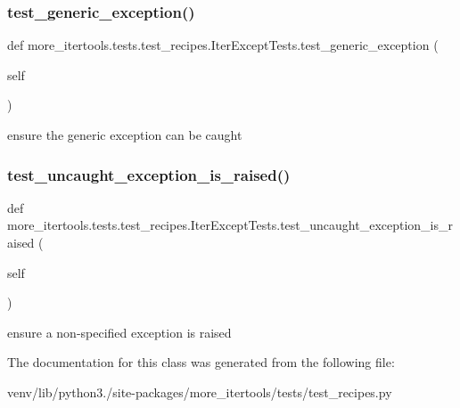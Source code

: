 \subsubsection{\texorpdfstring{test\+\_\+generic\+\_\+exception()}{test\_generic\_exception()}}
{\footnotesize\ttfamily def more\+\_\+itertools.\+tests.\+test\+\_\+recipes.\+Iter\+Except\+Tests.\+test\+\_\+generic\+\_\+exception (\begin{DoxyParamCaption}\item[{}]{self }\end{DoxyParamCaption})}

\begin{DoxyVerb}ensure the generic exception can be caught\end{DoxyVerb}
 \mbox{\label{classmore__itertools_1_1tests_1_1test__recipes_1_1_iter_except_tests_acbcd3f1ffb21efa2d005fa34e1d79dc3}} 
\subsubsection{\texorpdfstring{test\+\_\+uncaught\+\_\+exception\+\_\+is\+\_\+raised()}{test\_uncaught\_exception\_is\_raised()}}
{\footnotesize\ttfamily def more\+\_\+itertools.\+tests.\+test\+\_\+recipes.\+Iter\+Except\+Tests.\+test\+\_\+uncaught\+\_\+exception\+\_\+is\+\_\+raised (\begin{DoxyParamCaption}\item[{}]{self }\end{DoxyParamCaption})}

\begin{DoxyVerb}ensure a non-specified exception is raised\end{DoxyVerb}
 

The documentation for this class was generated from the following file\+:\begin{DoxyCompactItemize}
\item 
venv/lib/python3./site-\/packages/more\+\_\+itertools/tests/test\+\_\+recipes.\+py\end{DoxyCompactItemize}
